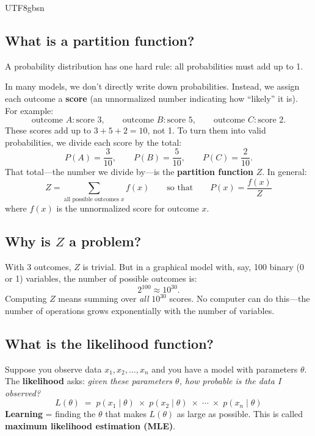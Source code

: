 \documentclass[11pt]{article}
\begin{document}
\begin{CJK}{UTF8}{gbsn}
\vspace{0.3em}
\noindent{}

\subsection*{What is a partition function?}

A probability distribution has one hard rule: all probabilities must add up to 1.

In many models, we don't directly write down probabilities. Instead, we assign each outcome a \textbf{score} (an unnormalized number indicating how ``likely'' it is). For example:
\[
  \text{outcome } A: \text{score } 3, \qquad
  \text{outcome } B: \text{score } 5, \qquad
  \text{outcome } C: \text{score } 2.
\]
These scores add up to $3 + 5 + 2 = 10$, not 1. To turn them into valid probabilities, we divide each score by the total:
\[
  P(A) = \frac{3}{10}, \qquad P(B) = \frac{5}{10}, \qquad P(C) = \frac{2}{10}.
\]
That total---the number we divide by---is the \textbf{partition function} $Z$. In general:
\[
  \boxed{Z = \sum_{\text{all possible outcomes } x} f(x)}
  \qquad \text{so that} \qquad
  P(x) = \frac{f(x)}{Z}
\]
where $f(x)$ is the unnormalized score for outcome $x$.

\subsection*{Why is $Z$ a problem?}

With 3 outcomes, $Z$ is trivial. But in a graphical model with, say, 100 binary (0 or 1) variables, the number of possible outcomes is:
\[
  2^{100} \approx 10^{30}.
\]
Computing $Z$ means summing over \emph{all} $10^{30}$ scores. No computer can do this---the number of operations grows exponentially with the number of variables.

\subsection*{What is the likelihood function?}

Suppose you observe data $x_1, x_2, \dots, x_n$ and you have a model with parameters $\theta$. The \textbf{likelihood} asks: \emph{given these parameters $\theta$, how probable is the data I observed?}
\[
  L(\theta) \;=\; p(x_1 \mid \theta) \;\times\; p(x_2 \mid \theta) \;\times\; \cdots \;\times\; p(x_n \mid \theta)
\]
\textbf{Learning} = finding the $\theta$ that makes $L(\theta)$ as large as possible. This is called \textbf{maximum likelihood estimation (MLE)}.


\end{CJK}
\end{document}

